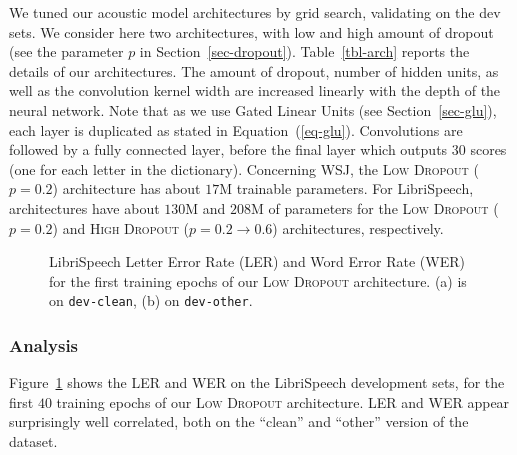 \documentclass{article}
\begin{document}
We tuned our acoustic model architectures by grid search, validating on the
dev sets. We consider here two architectures, with low and high amount of
dropout (see the parameter $p$ in Section~\ref{sec-dropout}).
Table~\ref{tbl-arch} reports the details of our architectures. The amount
of dropout, number of hidden units, as well as the convolution kernel width
are increased linearly with the depth of the neural network. Note that as
we use Gated Linear Units (see Section~\ref{sec-glu}), each layer is
duplicated as stated in Equation~(\ref{eq-glu}). Convolutions are followed
by a fully connected layer, before the final layer which outputs $30$
scores (one for each letter in the dictionary). Concerning WSJ, the
\textsc{Low Dropout} ($p=0.2$) architecture has about $17$M trainable
parameters. For LibriSpeech, architectures have about $130$M and
$208$M of parameters for the \textsc{Low Dropout} ($p=0.2$) and
\textsc{High Dropout} ($p=0.2\rightarrow 0.6$) architectures, respectively.

\begin{figure}
  \centering
  \caption{
    \label{fig-ler-wer}
    LibriSpeech Letter Error Rate (LER) and Word Error Rate (WER) for the
    first training epochs of our \textsc{Low Dropout} architecture. (a) is on
    \texttt{dev-clean}, (b) on \texttt{dev-other}.  }
\end{figure}


\subsubsection{Analysis}

Figure~\ref{fig-ler-wer} shows the LER and WER on the LibriSpeech
development sets, for the first $40$ training epochs of our \textsc{Low
  Dropout} architecture. LER and WER appear surprisingly well correlated,
both on the ``clean'' and ``other'' version of the dataset.
\end{document}
